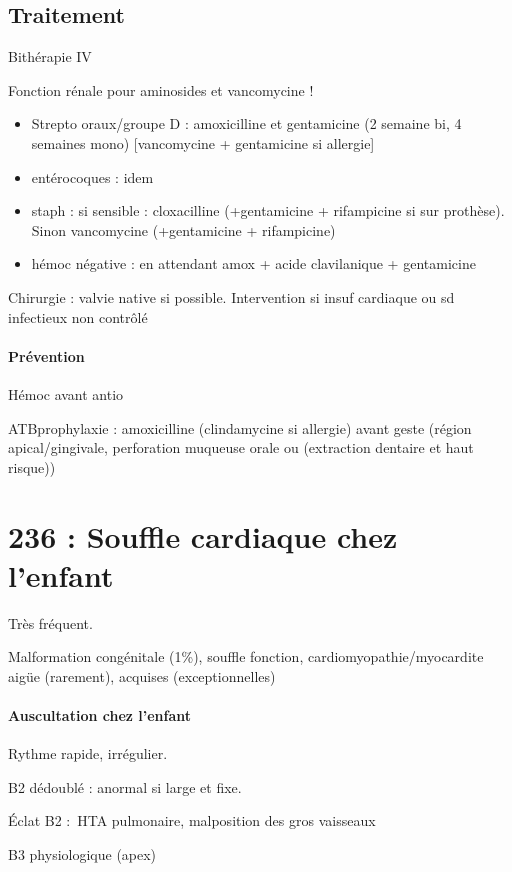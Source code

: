 \subsection{Traitement}
Bithérapie IV

Fonction rénale pour aminosides et vancomycine !

\begin{itemize}
  \item Strepto oraux/groupe D : amoxicilline et gentamicine (2 semaine bi, 4
    semaines mono) [vancomycine + gentamicine si allergie]
  \item entérocoques : idem
  \item staph : si sensible : cloxacilline (+gentamicine + rifampicine si sur
    prothèse). Sinon vancomycine (+gentamicine + rifampicine)
  \item hémoc négative : en attendant amox + acide clavilanique + gentamicine
\end{itemize}

Chirurgie : valvie native si possible. Intervention si insuf cardiaque ou sd
infectieux non contrôlé

\paragraph{Prévention}
Hémoc avant antio \danger

ATBprophylaxie : amoxicilline (clindamycine si allergie) avant geste (région
apical/gingivale, perforation muqueuse orale ou (extraction dentaire et haut
risque))

\section{236 : Souffle cardiaque chez l'enfant}%
\label{sec:236_souffle_cardiaque_chez_l_enfant}
Très fréquent.

Malformation congénitale (1\%), souffle fonction, cardiomyopathie/myocardite
aigüe (rarement), acquises (exceptionnelles)

\paragraph{Auscultation chez l'enfant} Rythme rapide, irrégulier.

B2 dédoublé : anormal si large et fixe.

Éclat B2 : HTA pulmonaire, malposition des gros vaisseaux

B3 physiologique (apex)

